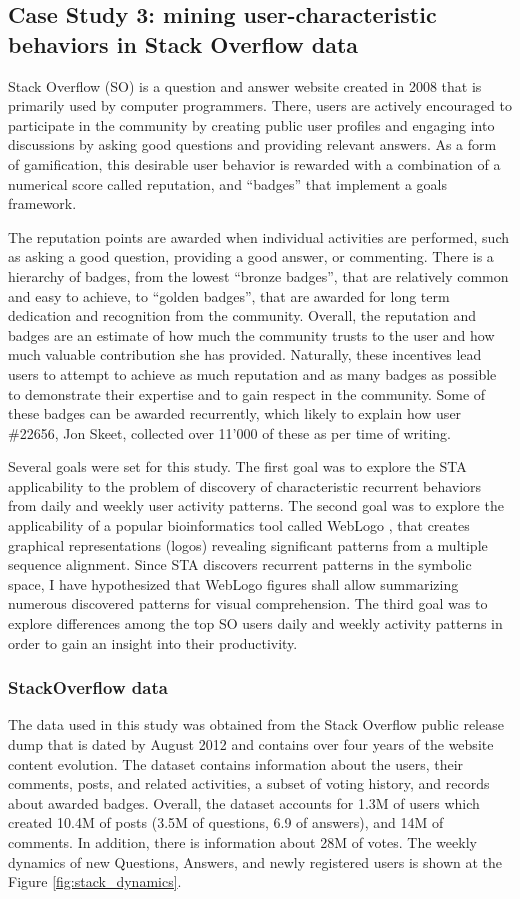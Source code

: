 \subsection{Case Study 3: mining user-characteristic behaviors in Stack Overflow data}\label{case3}
Stack Overflow (SO) is a question and answer website created in 2008 that is primarily used by computer programmers. There, users are actively encouraged to participate in the community by creating public user profiles and engaging into discussions by asking good questions and providing relevant answers. As a form of gamification, this desirable user behavior is rewarded with a combination of a numerical score called reputation, and ``badges'' that implement a goals framework. 

The reputation points are awarded when individual activities are performed, such as asking a good question, providing a good answer, or commenting. There is a hierarchy of badges, from the lowest ``bronze badges'', that are relatively common and easy to achieve, to ``golden badges'', that are awarded for long term dedication and recognition from the community. Overall, the reputation and badges are an estimate of how much the community trusts to the user and how much valuable contribution she has provided. Naturally, these incentives lead users to attempt to achieve as much reputation and as many badges as possible to demonstrate their expertise and to gain respect in the community. Some of these badges can be awarded recurrently, which likely to explain how user \#22656, Jon Skeet, collected over 11'000 of these as per time of writing.

Several goals were set for this study. The first goal was to explore the STA applicability to the problem of discovery of characteristic recurrent behaviors from daily and weekly user activity patterns. The second goal was to explore the applicability of a popular bioinformatics tool called WebLogo \cite{weblogo}, that creates graphical representations (logos) revealing significant patterns from a multiple sequence alignment. Since STA discovers recurrent patterns in the symbolic space, I have hypothesized that WebLogo figures shall allow summarizing numerous discovered patterns for visual comprehension. The third goal was to explore differences among the top SO users daily and weekly activity patterns in order to gain an insight into their productivity. 

\subsubsection{StackOverflow data}
The data used in this study was obtained from the Stack Overflow public release dump that is dated by August 2012 and contains over four years of the website content evolution. The dataset contains information about the users, their comments, posts, and related activities, a subset of voting history, and records about awarded badges.  Overall, the dataset accounts for 1.3M of users which created 10.4M of posts (3.5M of questions, 6.9 of answers), and 14M of comments. In addition, there is information about 28M of votes. The weekly dynamics of new Questions, Answers, and newly registered users is shown at the Figure \ref{fig:stack_dynamics}.

